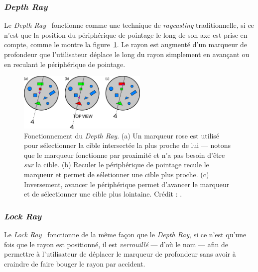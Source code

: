 	\subsubsection{\emph{Depth Ray}}
	Le \emph{Depth Ray}~\cite{grossman2006design} fonctionne comme une technique de \emph{raycasting} traditionnelle, si ce n'est que la position du périphérique de pointage le long de son axe est prise en compte, comme le montre la figure~\ref{fig:depthRay}. Le rayon est augmenté d'un marqueur de profondeur que l'utilisateur déplace le long du rayon simplement en avançant ou en reculant le périphérique de pointage.
	
	\newcommand{\rayWidth}{0.55\textwidth}
	\begin{figure}[!htb]
		\centering
		\includegraphics[width=\rayWidth]{figures/ch2/depthRay}
		\caption[Principe du \emph{Depth Ray}]{Fonctionnement du \emph{Depth Ray}. (a) Un marqueur rose est utilisé pour sélectionner la cible intersectée la plus proche de lui --- notons que le marqueur fonctionne par proximité et n'a pas besoin d'être \emph{sur} la cible. (b) Reculer le périphérique de pointage recule le marqueur et permet de séletionner une cible plus proche. (c) Inversement, avancer le périphérique permet d'avancer le marqueur et de sélectionner une cible plus lointaine. Crédit : \cite{grossman2006design}.}
		\label{fig:depthRay}
	\end{figure}
	
	\subsubsection{\emph{Lock Ray}}
	Le \emph{Lock Ray}~\cite{grossman2006design} fonctionne de la même façon que le \emph{Depth Ray}, si ce n'est qu'une fois que le rayon est positionné, il est \emph{verrouillé} --- d'où le nom --- afin de permettre à l'utilisateur de déplacer le marqueur de profondeur sans avoir à craindre de faire bouger le rayon par accident.
	
